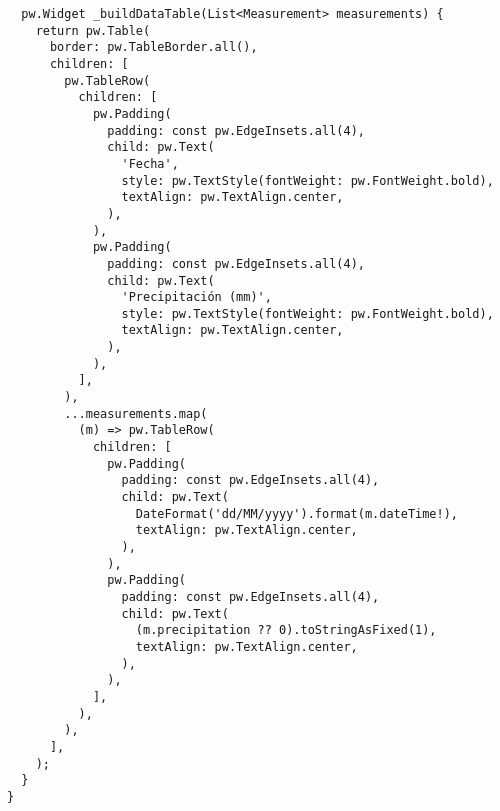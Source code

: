 \begin{verbatim}
  pw.Widget _buildDataTable(List<Measurement> measurements) {
    return pw.Table(
      border: pw.TableBorder.all(),
      children: [
        pw.TableRow(
          children: [
            pw.Padding(
              padding: const pw.EdgeInsets.all(4),
              child: pw.Text(
                'Fecha',
                style: pw.TextStyle(fontWeight: pw.FontWeight.bold),
                textAlign: pw.TextAlign.center,
              ),
            ),
            pw.Padding(
              padding: const pw.EdgeInsets.all(4),
              child: pw.Text(
                'Precipitación (mm)',
                style: pw.TextStyle(fontWeight: pw.FontWeight.bold),
                textAlign: pw.TextAlign.center,
              ),
            ),
          ],
        ),
        ...measurements.map(
          (m) => pw.TableRow(
            children: [
              pw.Padding(
                padding: const pw.EdgeInsets.all(4),
                child: pw.Text(
                  DateFormat('dd/MM/yyyy').format(m.dateTime!),
                  textAlign: pw.TextAlign.center,
                ),
              ),
              pw.Padding(
                padding: const pw.EdgeInsets.all(4),
                child: pw.Text(
                  (m.precipitation ?? 0).toStringAsFixed(1),
                  textAlign: pw.TextAlign.center,
                ),
              ),
            ],
          ),
        ),
      ],
    );
  }
}

\end{verbatim}






